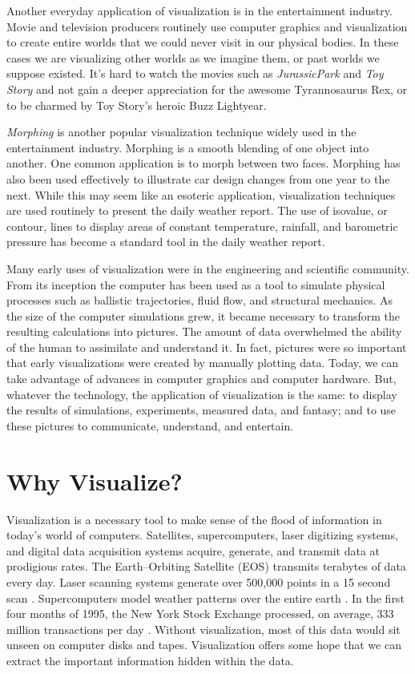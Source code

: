 Another everyday application of visualization is in the entertainment industry. Movie and television producers routinely use computer graphics and visualization to create entire worlds that we could never visit in our physical bodies. In these cases we are visualizing other worlds as we imagine them, or past worlds we suppose existed. It's hard to watch the movies such as \emph{JurassicPark} and \emph{Toy Story} and not gain a deeper appreciation for the awesome Tyrannosaurus Rex, or to be charmed by Toy Story's heroic Buzz Lightyear.

\emph{Morphing} is another popular visualization technique widely used in the entertainment industry. Morphing is a smooth blending of one object into another. One common application is to morph between two faces. Morphing has also been used effectively to illustrate car design changes from one year to the next. While this may seem like an esoteric application, visualization techniques are used routinely to present the daily weather report. The use of isovalue, or contour, lines to display areas of constant temperature, rainfall, and barometric pressure has become a standard tool in the daily weather report.

Many early uses of visualization were in the engineering and scientific community. From its inception the computer has been used as a tool to simulate physical processes such as ballistic trajectories, fluid flow, and structural mechanics. As the size of the computer simulations grew, it became necessary to transform the resulting calculations into pictures. The amount of data overwhelmed the ability of the human to assimilate and understand it. In fact, pictures were so important that early visualizations were created by manually plotting data. Today, we can take advantage of advances in computer graphics and computer hardware. But, whatever the technology, the application of visualization is the same: to display the results of simulations, experiments, measured data, and fantasy; and to use these pictures to communicate, understand, and entertain.

\section{Why Visualize?}

Visualization is a necessary tool to make sense of the flood of information in today's world of computers. Satellites, supercomputers, laser digitizing systems, and digital data acquisition systems acquire, generate, and transmit data at prodigious rates. The Earth--Orbiting Satellite (EOS) transmits terabytes of data every day. Laser scanning systems generate over 500,000 points in a 15 second scan \cite{Waters91}. Supercomputers model weather patterns over the entire earth \cite{Chen93}. In the first four months of 1995, the New York Stock Exchange processed, on average, 333 million transactions per day \cite{NYTimes}. Without visualization, most of this data would sit unseen on computer disks and tapes. Visualization offers some hope that we can extract the important information hidden within the data.

